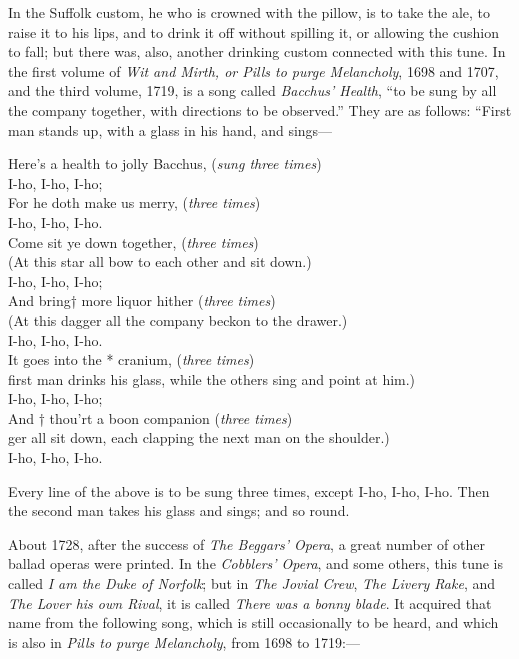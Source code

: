 In the Suffolk custom, he who is crowned with the pillow, is to take the ale, to
raise it to his lips, and to drink it off without spilling it, or allowing the cushion
to fall; but there was, also, another drinking custom connected with this tune.
In the first volume of \textit{Wit and Mirth, or\textit{ Pills to purge Melancholy}}, 1698 and
1707, and the third volume, 1719, is a song called \textit{Bacchus’ Health}, “to be sung
by all the company together, with directions to be observed.” They are as
follows: “First man stands up, with a glass in his hand, and sings—
\begin{scverse}
\begin{patverse}
Here’s a health to jolly Bacchus, (\textit{sung three times})\\
I-ho, I-ho, I-ho;\\
For he doth make us merry, (\textit{three times})\\
I-ho, I-ho, I-ho.\\
\vleftofline{* }Come sit ye down together, (\textit{three times})\\
{\footnotesize (At this star all bow to each other and sit down.)}\\
I-ho, I-ho, I-ho;\\
And bring† more liquor hither (\textit{three times})\\
{\footnotesize (At this dagger all the company beckon to the drawer.)}\\
I-ho, I-ho, I-ho.\\
It goes into the * cranium, (\textit{three times})\\
{\footnotesize {} first man drinks his glass, while the others sing and point at him.)}\\
I-ho, I-ho, I-ho;\\
And † thou’rt a boon companion (\textit{three times})\\
{\footnotesize {}ger all sit down, each clapping the next man on the shoulder.)}\\
I-ho, I-ho, I-ho.
\end{patverse}
\end{scverse}
Every line of the above is to be sung three times, except I-ho, I-ho, I-ho. Then
the second man takes his glass and sings; and so round.

About 1728, after the success of \textit{The Beggars’ Opera}, a great number of other
ballad operas were printed. In the \textit{Cobblers’ Opera}, and some others, this tune is
called \textit{I am the Duke of Norfolk}; but in \textit{The Jovial Crew}, \textit{The Livery Rake}, and
\textit{The Lover his own Rival}, it is called \textit{There was a bonny blade}. It acquired that
name from the following song, which is still occasionally to be heard, and which
is also in \textit{Pills to purge Melancholy}, from 1698 to 1719:—
\pagebreak

